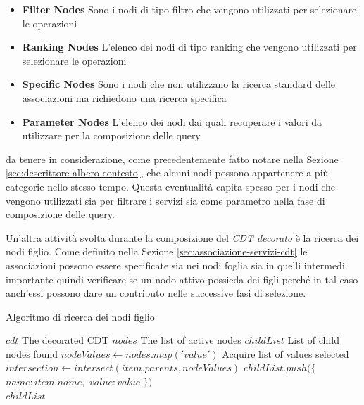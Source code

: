 \begin{itemize}
	\item \textbf{Filter Nodes} Sono i nodi di tipo filtro che vengono utilizzati per selezionare le operazioni
	\item \textbf{Ranking Nodes} L'elenco dei nodi di tipo ranking che vengono utilizzati per selezionare le operazioni
	\item \textbf{Specific Nodes} Sono i nodi che non utilizzano la ricerca standard delle associazioni ma richiedono una ricerca specifica
	\item \textbf{Parameter Nodes} L'elenco dei nodi dai quali recuperare i valori da utilizzare per la composizione delle query
\end{itemize}

\upe da tenere in considerazione, come precedentemente fatto notare nella Sezione \ref{sec:descrittore-albero-contesto}, che alcuni nodi possono appartenere a più categorie nello stesso tempo. Questa eventualità capita spesso per i nodi che vengono utilizzati sia per filtrare i servizi sia come parametro nella fase di composizione delle query.

Un'altra attività svolta durante la composizione del \emph{CDT decorato} è la ricerca dei nodi figlio. Come definito nella Sezione \ref{sec:associazione-servizi-cdt} le associazioni possono essere specificate sia nei nodi foglia sia in quelli intermedi. \upe importante quindi verificare se un nodo attivo possieda dei figli perché in tal caso anch'essi possono dare un contributo nelle successive fasi di selezione.

\begin{algorithm}
	\caption{Algoritmo di ricerca dei nodi figlio}
	\label{alg:algoritmo-ricerca-nodi-figlio}
	\begin{algorithmic}
		\Require
			\Statex $cdt$ \Comment The decorated CDT
			\Statex $nodes$ \Comment The list of active nodes
		\Ensure
			\Statex $childList$ \Comment List of child nodes found
		\Statex
		\State $nodeValues \gets nodes.map('value')$ \Comment Acquire list of values selected
			\State $ intersection \gets intersect(item.parents, nodeValues) $
					\State $ childList.push(\{ $
					\State\hspace{\algorithmicindent} $ name: item.name, $
					\State\hspace{\algorithmicindent} $ value: value $
					\State $ \}) $
				\EndFor
			\EndIf
		\EndFor\\
		\Return $ childList $
	\end{algorithmic}
\end{algorithm}

